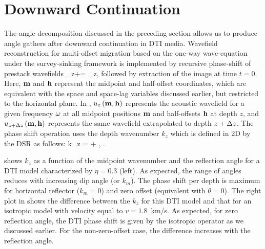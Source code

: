 \section{Downward Continuation}

The angle decomposition discussed in the preceding section allows us
to produce angle gathers after downward continuation in DTI media.
Wavefield reconstruction for multi-offset migration based on the
one-way wave-equation under the survey-sinking framework
\cite[]{Claerbout.iei} is implemented by recursive phase-shift of
prestack wavefields
%
\beq \label{eqn:PHS-SS}
\UU_{z+\dz}\ofmh = \PS{-}\UU_z\ofmh \;,
\eeq
%
followed by extraction of the image at time $t=0$.  Here, ${\bf m}$ and
${\bf h}$ represent the midpoint and half-offset coordinates, which are
equivalent with the space and space-lag variables discussed earlier,
but restricted to the horizontal plane. In , ${u}_z\left ( {\bf m},{\bf h}\right)$
represents the acoustic wavefield for a given frequency $\omega$ at all
midpoint positions ${\bf m}$ and half-offsets ${\bf h}$ at depth $z$, and
${u}_{z+\Delta z}\left ( {\bf m},{\bf h}\right)$ represents the same wavefield extrapolated to depth
$z+\Delta z$. The phase shift operation uses the depth wavenumber $k_z$
which is defined in 2D by the DSR  as follows:
%
\beq \label{eqn:dsr22}
k_z = 
 + 
 \;,
\eeq
{}.

 shows $k_z$ as a function of the midpoint wavenumber and the
reflection angle for a DTI model characterized by $\eta=0.3$ (left).
As expected, the range of angles reduces with increasing dip angle (or
$k_m$). The phase shift per depth is maximum for horizontal reflector
($k_m=0$) and zero offset (equivalent with $\theta=0$). The right
plot in  shows the difference between the $k_z$ for this DTI
model and that for an isotropic model with velocity equal to
$v=1.8$~km/s. As expected, for zero reflection angle, the
DTI phase shift is given by the isotropic operator as we discussed
earlier. For the non-zero-offset case, the difference increases with
the reflection angle.

